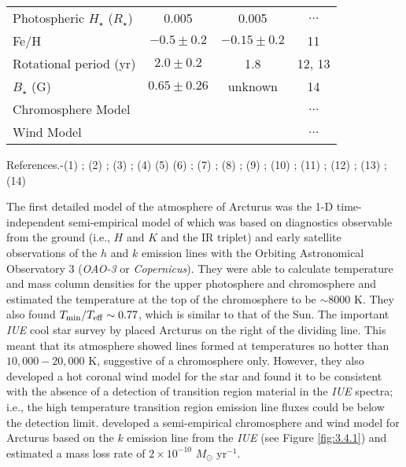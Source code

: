 {\begin{table}[!hb]
\begin{center}
\begin{tabular}{lccc}
Photospheric $H_{\star}$ ($R_{\star}$)& 0.005& 0.005& $\ldots$\\
Fe/H& $-0.5\pm0.2$ & $- 0.15 \pm 0.2$ & 11\\
Rotational period (yr) & $2.0 \pm 0.2$ & 1.8 & 12, 13\\
$B_{\star}$ (G) & $0.65 \pm 0.26$ & unknown & 14\\
Chromosphere Model & \cite{drake_1985} & \cite{mcmurry_1999}& $\ldots$\\
Wind Model & \cite{drake_1985}& \cite{robinson_1998}& $\ldots$\\
\hline
\end{tabular}
\label{tab:3.4}
\begin{minipage}{14.0cm}
References.-(1) \cite{perryman_1997}; (2) \cite{van_leeuwen_2007}; (3) \cite{kallinger_2010}; (4) \cite{lebzelter_2012}  (5) \cite{ramirez_2011} (6) \cite{richichi_2005}; (7) \cite{di_benedetto_1993}; (8) \cite{massarotti_2008}; (9) \cite{drake_1985}; (10) \cite{robinson_1998};  (11) \cite{decin_2003}; (12) \cite{gray_2006}; (13) \cite{hatzes_1993}; (14) \cite{sennhauser_2011}
\end{minipage}
\end{center}
\end{table}
\clearpage}

The first detailed model of the atmosphere of Arcturus was the 1-D time-independent semi-empirical model of \cite{ayres_1975} which was based on diagnostics observable from the ground (i.e.,  $H$ and $K$ and the  IR triplet) and early satellite observations of the  $h$ and $k$ emission lines with the Orbiting Astronomical Observatory 3 (\textit{OAO-3} or \textit{Copernicus}). They were able to calculate temperature and mass column densities for the upper photosphere and chromosphere and estimated the temperature at the top of the chromosphere to be $\sim 8000$ K. They also found $T_{\rm{min}}/T_{\rm{eff}} \sim 0.77$, which is similar to that of the Sun. The important \textit{IUE} cool star survey by \cite{linsky_1979} placed Arcturus on the right of the dividing line. This meant that its atmosphere showed lines formed at temperatures no hotter than $10,000 - 20,000$ K, suggestive of a chromosphere only. However, they also developed a hot coronal wind model for the star and found it to be consistent with the absence of a detection of transition region material in the \textit{IUE} spectra; i.e., the high temperature transition region emission line fluxes could be below the detection limit. \cite{drake_1985} developed a semi-empirical chromosphere and wind model for Arcturus based on the  $k$ emission line from the \textit{IUE} (see Figure \ref{fig:3.4.1}) and estimated a mass loss rate of $2\times 10^{-10}$ $M_{\odot}$ yr$^{-1}$.

